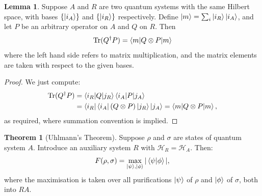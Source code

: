 \documentclass[12pt,a4paper]{report}
\numberwithin{equation}{section}
\newcommand{\tr}{\text{Tr}}
\theoremstyle{definition}
\theoremstyle{theorem}
\newtheorem{theorem}{Theorem}[section]
\theoremstyle{theorem}
\newtheorem{lemma}{Lemma}[section]
\theoremstyle{example}
\theoremstyle{definition}
\begin{document}
\begin{lemma}
	Suppose $A$ and $R$ are two quantum systems with the same Hilbert space, with bases $\{\ket{i_{A}}\}$ and $\{\ket{i_{R}}\}$ respectively. Define $\ket{m}=\sum_{i}\ket{i_{R}}\ket{i_{A}}$, and let $P$ be an arbitrary operator on $A$ and $Q$ on $R$. Then
	\begin{equation}
		\tr(Q^{\dagger}P)=\braket{m|Q\otimes P|m}
	\end{equation}
	where the left hand side refers to matrix multiplication, and the matrix elements are taken with respect to the given bases.
\end{lemma}
\begin{proof}
	We just compute:
	\begin{equation}
		\begin{aligned}
			\tr(Q^{\dagger}P)&=\braket{i_{R}|Q|j_{R}}\braket{i_{A}|P|j_{A}}\\&=\bra{i_{R}}\bra{i_{A}}(Q\otimes P)\ket{j_{R}}\ket{j_{A}}=\braket{m|Q\otimes P|m},
		\end{aligned}
	\end{equation}
	as required, where summation convention is implied.
\end{proof}
\begin{theorem}[Uhlmann's Theorem]
	Suppose $\rho$ and $\sigma$ are states of quantum system $A$. Introduce an auxiliary system $R$ with $\mathcal{H}_{R}=\mathcal{H}_{A}$. Then:
	\begin{equation}
		F(\rho,\sigma)=\max_{\ket{\psi},\ket{\phi}}|\braket{\psi|\phi}|,
	\end{equation}
	where the maximisation is taken over all purifications $\ket{\psi}$ of $\rho$ and $\ket{\phi}$ of $\sigma$, both into $RA$.
\end{theorem}
\end{document}
